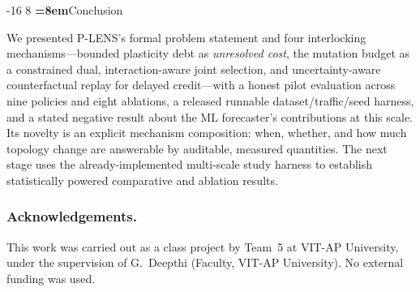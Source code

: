 \documentclass[runningheads]{llncs}
\makeatletter
\renewcommand\section{\@startsection{section}{1}{\z@}%
  {-16\p@ \@plus -4\p@ \@minus -4\p@}%
  {8\p@ \@plus 4\p@ \@minus 4\p@}%
  {\normalfont\large\bfseries\boldmath\color{vitblue}%
   \rightskip=\z@ \@plus 8em\pretolerance=10000}}
\let\plens@section\section
\renewcommand\section{\clearpage\plens@section}
\makeatother
\begin{document}
\section{Conclusion}
\label{sec:conclusion}

We presented P-LENS's formal problem statement and four interlocking
mechanisms---bounded plasticity debt as \emph{unresolved cost}, the
mutation budget as a constrained dual, interaction-aware joint selection,
and uncertainty-aware counterfactual replay for delayed credit---with a
honest pilot evaluation across nine policies and eight ablations, a
released runnable dataset/traffic/seed harness, and a stated negative
result about the ML forecaster's contributions at this scale. Its novelty
is an explicit mechanism composition: when, whether, and how much topology
change are answerable by auditable, measured quantities. The next stage
uses the already-implemented multi-scale study harness to establish
statistically powered comparative and ablation results.


\subsubsection*{Acknowledgements.}
This work was carried out as a class project by Team~5 at VIT-AP University,
under the supervision of G.~Deepthi (Faculty, VIT-AP University). No
external funding was used.



\end{document}
